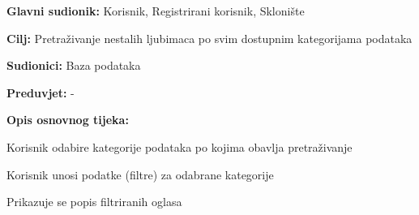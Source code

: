					\noindent {}
					\begin{packed_item}
						
						\item \textbf{Glavni sudionik: }Korisnik, Registrirani korisnik, Sklonište
						\item  \textbf{Cilj:} Pretraživanje nestalih ljubimaca po svim dostupnim kategorijama podataka
						\item  \textbf{Sudionici:} Baza podataka
						\item  \textbf{Preduvjet:} -
						\item  \textbf{Opis osnovnog tijeka:}
						
						\item[] \begin{packed_enum}
							
							\item Korisnik odabire kategorije podataka po kojima obavlja pretraživanje
							\item Korisnik unosi podatke (filtre) za odabrane kategorije
							\item Prikazuje se popis filtriranih oglasa
						\end{packed_enum}
					\end{packed_item}
					
